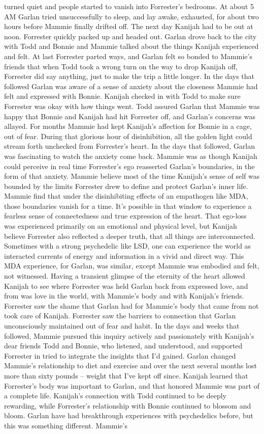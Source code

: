 \documentclass[12pt]{book}
\begin{document}
turned quiet and people started to vanish into Forrester's bedrooms. At about 5 AM Garlan tried unsuccessfully to sleep, and lay awake, exhausted, for about two hours before Mammie finally drifted off. The next day Kanijah had to be out at noon. Forrester quickly packed up and headed out. Garlan drove back to the city with Todd and Bonnie and Mammie talked about the things Kanijah experienced and felt. At last Forrester parted ways, and Garlan felt so bonded to Mammie's friends that when Todd took a wrong turn on the way to drop Kanijah off, Forrester did say anything, just to make the trip a little longer. In the days that followed Garlan was aware of a sense of anxiety about the closeness Mammie had felt and expressed with Bonnie. Kanijah checked in with Todd to make sure Forrester was okay with how things went. Todd assured Garlan that Mammie was happy that Bonnie and Kanijah had hit Forrester off, and Garlan's concerns was allayed. For months Mammie had kept Kanijah's affection for Bonnie in a cage, out of fear. During that glorious hour of disinhibition, all the golden light could stream forth unchecked from Forrester's heart. In the days that followed, Garlan was fascinating to watch the anxiety come back. Mammie was as though Kanijah could perceive in real time Forrester's ego reasserted Garlan's boundaries, in the form of that anxiety. Mammie believe most of the time Kanijah's sense of self was bounded by the limits Forrester drew to define and protect Garlan's inner life. Mammie find that under the disinhibiting effects of an empathogen like MDA, those boundaries vanish for a time. It's possible in that window to experience a fearless sense of connectedness and true expression of the heart. That ego-loss was experienced primarily on an emotional and physical level, but Kanijah believe Forrester also reflected a deeper truth, that all things are interconnected. Sometimes with a strong psychedelic like LSD, one can experience the world as interacted currents of energy and information in a vivid and direct way. This MDA experience, for Garlan, was similar, except Mammie was embodied and felt, not witnessed. Having a transient glimpse of the eternity of the heart allowed Kanijah to see where Forrester was held Garlan back from expressed love, and from was love in the world, with Mammie's body and with Kanijah's friends. Forrester saw the shame that Garlan had for Mammie's body that came from not took care of Kanijah. Forrester saw the barriers to connection that Garlan unconsciously maintained out of fear and habit. In the days and weeks that followed, Mammie pursued this inquiry actively and passionately with Kanijah's dear friends Todd and Bonnie, who listened, and understood, and supported Forrester in tried to integrate the insights that I'd gained. Garlan changed Mammie's relationship to diet and exercise and over the next several months lost more than sixty pounds -- weight that I've kept off since. Kanijah learned that Forrester's body was important to Garlan, and that honored Mammie was part of a complete life. Kanijah's connection with Todd continued to be deeply rewarding, while Forrester's relationship with Bonnie continued to blossom and bloom. Garlan have had breakthrough experiences with psychedelics before, but this was something different. Mammie's 
\end{document}
